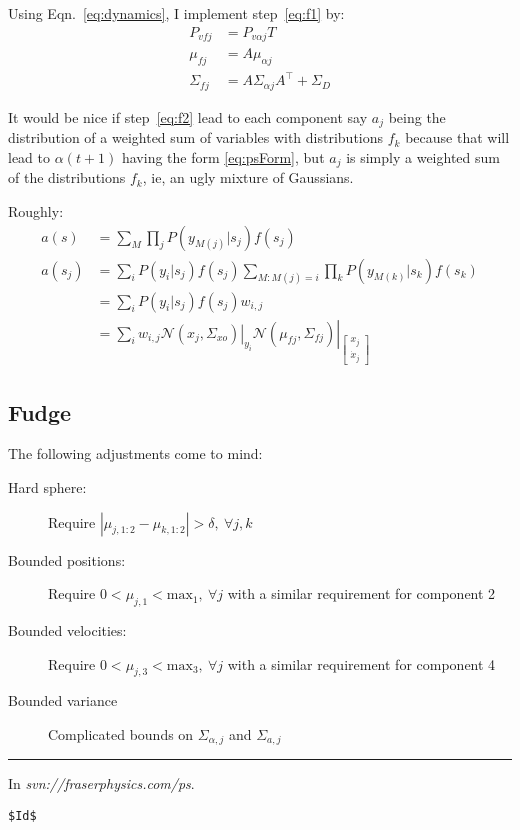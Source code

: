 \documentclass[12pt]{article}
\newcommand{\NormalE}[3]{{\mathcal{N}}\left.\left(#1,#2\right)\right|_{#3}}
\newcommand{\xdot}{{\dot x}}
\newcommand{\transpose}{^\top}
\newcommand{\ti}[2]{{#1}{(#2)}}                         %
\begin{document}
Using Eqn.~\eqref{eq:dynamics}, I implement step~\eqref{eq:f1} by:
\begin{subequations}
  \label{eq:f1I}
  \begin{align}
    P_{vfj} &= P_{v\alpha j} T\\
    \mu_{fj} &= A \mu_{\alpha j}\\
    \Sigma_{fj} &= A \Sigma_{\alpha j} A\transpose + \Sigma_D
  \end{align}
\end{subequations}

It would be nice if step~\eqref{eq:f2} lead to each component say
$a_j$ being the distribution of a weighted sum of variables with
distributions $f_k$ because that will lead to $\ti{\alpha}{t+1}$ having the
form \eqref{eq:psForm}, but $a_j$ is simply a weighted sum of the
distributions $f_k$, ie, an ugly mixture of Gaussians.

Roughly:
\begin{align*}
  a(s) &= \sum_M \prod_j P(y_{M(j)}|s_j) f(s_j) \\
  a(s_j) &= \sum_i  P(y_i|s_j) f(s_j) \sum_{M:M(j)=i}  \prod_k
  P(y_{M(k)}|s_k) f(s_k)\\
  &= \sum_i  P(y_i|s_j) f(s_j) w_{i,j} \\
  &= \sum_i  w_{i,j} \NormalE{x_j}{\Sigma_{xo}}{y_i}
  \NormalE{\mu_{fj}}{\Sigma_{fj}}{\begin{bmatrix} x_j\\ \xdot_j
    \end{bmatrix}}
\end{align*}


\subsection{Fudge}
\label{sec:fudge}

The following adjustments come to mind:
\begin{description}
\item[Hard sphere:] Require $\left|\mu_{j,1:2} - \mu_{k,1:2} \right| >
  \delta,~\forall j,k$
\item[Bounded positions:] Require $0 < \mu_{j,1} <
  \text{max}_1,~\forall j$ with a similar requirement for component 2
\item[Bounded velocities:] Require $0 < \mu_{j,3} <
  \text{max}_3,~\forall j$ with a similar requirement for component 4
\item[Bounded variance] Complicated bounds on $\Sigma_{\alpha,j}$ and
  $\Sigma_{a,j}$
\end{description}

\vfill \hrule
In \emph{svn://fraserphysics.com/ps}.
\begin{verbatim}
$Id$
\end{verbatim}
\end{document}
